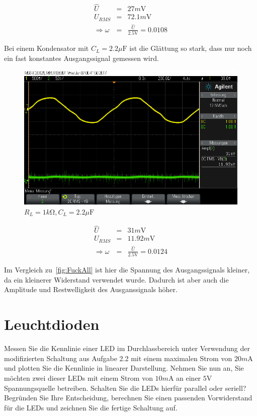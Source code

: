\documentclass[10pt]{scrreprt}
\begin{document}
    \begin{eqnarray*}
        \hat{U} &=& 27\si{m\volt}\\
        U_{RMS} &=& 72.1\si{m\volt}\\
        \Rightarrow \omega &=& \frac{\hat{U}}{2.5\si{\volt}} = 0.0108
    \end{eqnarray*}

    Bei einem Kondensator mit $C_L = 2.2\si{\mu\farad}$ ist die Glättung so stark,
    dass nur noch ein fast konstantes Ausgangssignal gemessen wird.

    \begin{figure}[H]
        \includegraphics[width=\textwidth]{scope_7.png}
        \caption{$R_L  = 1\si{k \ohm}, C_L = 2.2\si{\mu \farad}$}
    \end{figure}

    \begin{eqnarray*}
        \hat{U} &=& 31\si{m\volt}\\
        U_{RMS} &=& 11.92\si{m\volt}\\
        \Rightarrow \omega &=& \frac{\hat{U}}{2.5\si{\volt}} = 0.0124
    \end{eqnarray*}

    Im Vergleich zu~\ref{fig:FuckAll} ist hier die Spannung des Ausgangssignals
    kleiner, da ein kleinerer Widerstand verwendet wurde. Dadurch ist aber auch
    die Amplitude und Restwelligkeit des Ausganssignals höher.


    \section{Leuchtdioden}
    Messen Sie die Kennlinie einer LED im Durchlassbereich unter Verwendung der
    modifizierten Schaltung aus Aufgabe 2.2 mit einem maximalen Strom von $20\si{m\ampere}$ und plotten
    Sie die Kennlinie in linearer Darstellung.
    Nehmen Sie nun an, Sie möchten zwei dieser LEDs mit einem Strom von $10\si{m\ampere}$ an
    einer $5\si{\volt}$ Spannungsquelle betreiben. Schalten Sie die LEDs hierfür parallel oder seriell?
    Begründen Sie Ihre Entscheidung, berechnen Sie einen passenden Vorwiderstand für die
    LEDs und zeichnen Sie die fertige Schaltung auf.
\end{document}
